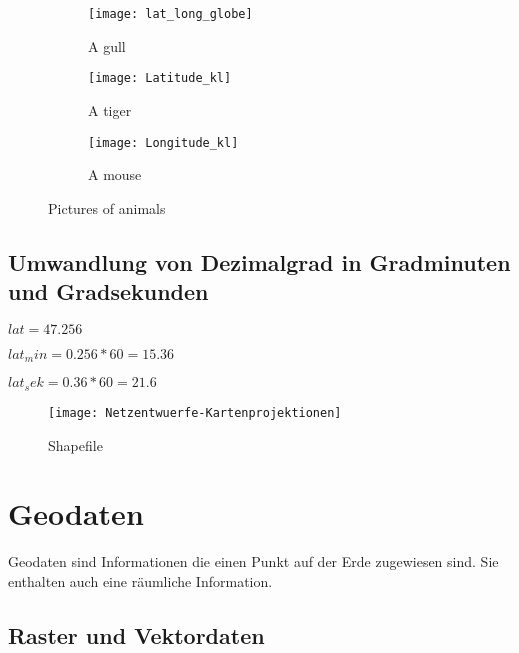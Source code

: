 \documentclass[11pt,fleqn]{book} %
\begin{document}
 
\begin{figure}
        \centering
        \begin{subfigure}[h]{0.2\textwidth}
                \texttt{[image: lat\_long\_globe]}
                \caption{A gull}
                \label{fig:gull}
        \end{subfigure}
     
        \begin{subfigure}[h]{0.2\textwidth}
                \texttt{[image: Latitude\_kl]}
                \caption{A tiger}
                \label{fig:tiger}
        \end{subfigure}
      
        \begin{subfigure}[h]{0.2\textwidth}
                \texttt{[image: Longitude\_kl]}
                \caption{A mouse}
                \label{fig:mouse}
        \end{subfigure}
        \caption{Pictures of animals}\label{fig:animals}
\end{figure} 

\section{Umwandlung von Dezimalgrad in Gradminuten und Gradsekunden}

$lat=47.256$

$lat_min=0.256*60=15.36$

$lat_sek=0.36*60=21.6$

\begin{figure}[h]
\centering\texttt{[image: Netzentwuerfe-Kartenprojektionen]}
\caption{Shapefile}
\end{figure}



\chapter{Geodaten}
Geodaten sind Informationen die einen Punkt auf der Erde zugewiesen sind. Sie enthalten auch eine r\"aumliche Information.
\section{Raster und Vektordaten}
\end{document}
